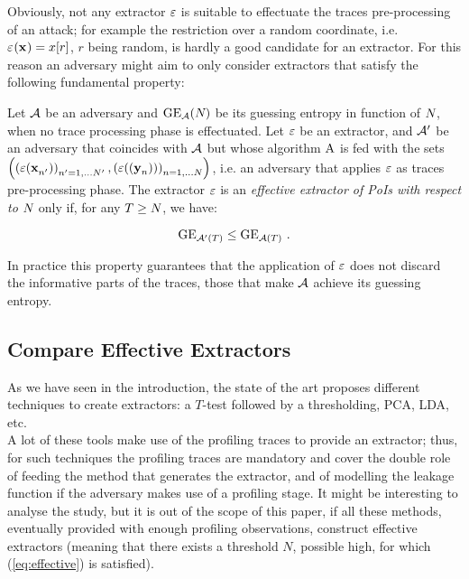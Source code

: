 Obviously, not any extractor $\extract$ is suitable to effectuate the traces pre-processing of an attack; for example the restriction over a random coordinate, i.e. $\extractor{\sss[]{}} = x[r]$, $r$ being random, is hardly a good candidate for an extractor. For this reason an adversary might aim to only consider extractors that satisfy the following fundamental property:

\begin{property}
Let $\adversary$ be an adversary and $\guessingEntropy_\adversary(\numTraces[])$ be its guessing entropy in function of $\numTraces[]$, when no trace processing phase is effectuated. Let $\extract$ be an extractor, and $\adversary'$ be an adversary that coincides with $\adversary$ but whose algorithm $\attackAlgorithm$ is fed with the sets $ \left( \left(\extract(\sss[]{n'})\right)_{n'=1,\dots \numTraces[]'}, \left(\extract((\sssTest[]{n}))\right)_{n=1,\dots \numTraces[]} \right)$, i.e. an adversary that applies $\extract$ as traces pre-processing phase. The extractor $\extract$ is an {\em effective  extractor of PoIs with respect to $\numTraces[]$} only if, for any $T \geq\numTraces[] $, we have:

\begin{equation}\label{eq:effective}
\guessingEntropy_{\adversary'(T)} \leq \guessingEntropy_{\adversary(T)}\mbox{ .}
\end{equation}

\end{property}
In practice this property guarantees that the application of $\extract$ does not discard the informative parts of the traces, those that make $\adversary$ achieve its guessing entropy.

\subsection{Compare Effective Extractors}\label{sec:adversary_description}


As we have seen in the introduction, the state of the art proposes different techniques to create extractors:  a $T$-test followed by a thresholding, PCA, LDA, etc.\\
A lot of these tools make use of the profiling traces to provide an extractor; thus, for such techniques the profiling traces are mandatory and cover the double role of feeding the method that generates the extractor, and of modelling the leakage function if the adversary makes use of a profiling stage. It might be interesting to analyse the study, but it is out of the scope of this paper, if all these methods, eventually provided with enough profiling observations, construct effective extractors (meaning that there exists a threshold $N$, possible high, for which (\ref{eq:effective}) is satisfied).\\

